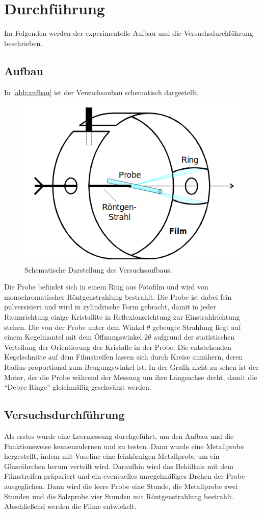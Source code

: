 \section{Durchführung}
Im Folgenden werden der experimentelle Aufbau und die Versuchsdurchführung beschrieben.
\subsection{Aufbau}
In \autoref{abb:aufbau} ist der Versuchsaubau schematisch dargestellt.
\begin{figure}
  \centering
  \includegraphics[scale=0.5]{content/pics/aufbau.png}
  \caption{Schematische Darstellung des Versuchsaufbaus. \cite{anleitung}}
  \label{abb:aufbau}
\end{figure}
Die Probe befindet sich in einem Ring aus Fotofilm und wird von monochromatischer
Röntgenstrahlung bestrahlt. Die Probe ist dabei fein pulversisiert und wird in zylindrische
Form gebracht, damit in jeder Raumrichtung einige Kristallite in Reflexionsrichtung
zur Einstrahlrichtung stehen. Die von der Probe unter dem Winkel $\theta$ gebeugte
Strahlung liegt auf einem
Kegelmantel mit dem Öffnungswinkel $2\theta$ aufgrund der statistischen Verteilung der
Orientierung der Kristalle in der Probe. Die entstehenden Kegelschnitte auf dem Filmstreifen
lassen sich durch Kreise annähern, deren Radius proportional zum Beugungswinkel ist.
In der Grafik nicht zu sehen ist der Motor, der die Probe während der Messung um ihre
Längsachse dreht, damit die \enquote{Debye-Ringe} gleichmäßig geschwärzt werden.
\subsection{Versuchsdurchführung}
Als erstes wurde eine Leermessung durchgeführt, um den Aufbau und die Funktionsweise
kennenzulernen und zu testen. Dann wurde eine Metallprobe hergestellt, indem
mit Vaseline eine feinkörnigen Metallprobe um ein Glasröhrchen herum verteilt wird.
Daraufhin wird das Behältnis mit dem Filmstreifen präpariert und ein eventuelles
unregelmäßiges Drehen der Probe ausgeglichen. Dann wird die leere Probe eine Stunde,
die Metallprobe zwei Stunden und die Salzprobe vier Stunden mit Röntgenstrahlung
bestrahlt. Abschließend werden die Filme entwickelt.
